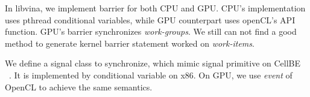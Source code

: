 In libvina, we implement barrier for both CPU and GPU. CPU's
implementation uses pthread conditional variables, while GPU counterpart
uses openCL's API function. GPU's barrier synchronizes
\emph{work-groups}. We still can not find a good method to generate kernel
barrier statement worked on \emph{work-items}.

We define a signal class to synchronize, which mimic
signal primitive on CellBE ~\cite{cellnetwork}. It is implemented by
conditional variable on x86. On GPU, we use \emph{event} of OpenCL to
achieve the same semantics.

